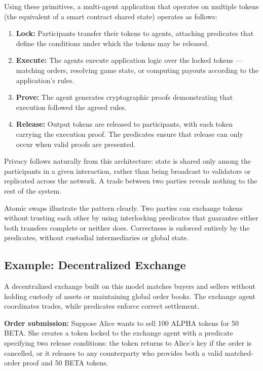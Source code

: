 \documentclass{article}
\begin{document}
Using these primitives, a multi-agent application that operates on multiple tokens (the equivalent of a smart contract shared state) operates as follows:

\begin{enumerate}
    \item \textbf{Lock:} Participants transfer their tokens to agents, attaching predicates that define the conditions under which the tokens may be released.

    \item \textbf{Execute:} The agents execute application logic over the locked tokens --- matching orders, resolving game state, or computing payouts according to the application's rules.

    \item \textbf{Prove:} The agent generates cryptographic proofs demonstrating that execution followed the agreed rules.

    \item \textbf{Release:} Output tokens are released to participants, with each token carrying the execution proof. The predicates ensure that release can only occur when valid proofs are presented.
\end{enumerate}

Privacy follows naturally from this architecture: state is shared only among the participants in a given interaction, rather than being broadcast to validators or replicated across the network. A trade between two parties reveals nothing to the rest of the system.

Atomic swaps illustrate the pattern clearly. Two parties can exchange tokens without trusting each other by using interlocking predicates that guarantee either both transfers complete or neither does. Correctness is enforced entirely by the predicates, without custodial intermediaries or global state.

\subsection{Example: Decentralized Exchange}

A decentralized exchange built on this model matches buyers and sellers without holding custody of assets or maintaining global order books. The exchange agent coordinates trades, while predicates enforce correct settlement.

\textbf{Order submission:} Suppose Alice wants to sell 100 ALPHA tokens for 50 BETA. She creates a token locked to the exchange agent with a predicate specifying two release conditions: the token returns to Alice's key if the order is cancelled, or it releases to any counterparty who provides both a valid matched-order proof and 50 BETA tokens.
\end{document}
